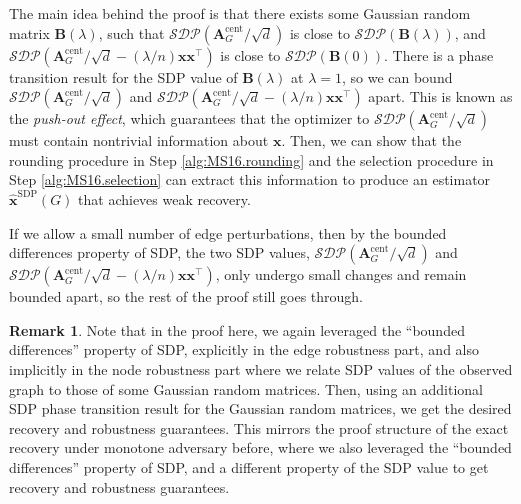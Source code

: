 \documentclass[11pt, titlepage]{article} %
\numberwithin{equation}{section}
\theoremstyle{definition}
\newtheorem{remark}{Remark}
\numberwithin{theorem}{section}
\numberwithin{lemma}{section}
\numberwithin{corollary}{section}
\numberwithin{proposition}{section}
\numberwithin{definition}{section}
\numberwithin{remark}{section}
\begin{document}
The main idea behind the proof is that there exists some Gaussian random matrix $\bm{B}(\lambda)$, 
such that $\mathcal{SDP}(\bm{A}_{G}^{\mathrm{cent}}/\sqrt{d})$ is close to 
$\mathcal{SDP}(\bm{B}(\lambda))$, and $\mathcal{SDP}(\bm{A}_{G}^{\mathrm{cent}}/\sqrt{d}
- (\lambda / n)\bm{x}\bm{x}^\top)$ is close to $\mathcal{SDP}(\bm{B}(0))$. There is a phase
transition result for the SDP value of $\bm{B}(\lambda)$ at $\lambda = 1$, so we can bound
$\mathcal{SDP}(\bm{A}_{G}^{\mathrm{cent}}/\sqrt{d})$ and $\mathcal{SDP}(\bm{A}_{G}^{\mathrm{cent}}/\sqrt{d}
- (\lambda / n)\bm{x}\bm{x}^\top)$ apart. This is known as the \emph{push-out effect},
which guarantees that the optimizer to $\mathcal{SDP}(\bm{A}_{G}^{\mathrm{cent}}/\sqrt{d})$ 
must contain nontrivial information about $\bm{x}$. Then, we can show that the rounding procedure in 
Step \ref{alg:MS16.rounding} and the selection procedure in Step \ref{alg:MS16.selection} can 
extract this information to produce an estimator $\hat{\bm{x}}^\mathrm{SDP}(G)$ that 
achieves weak recovery.

If we allow a small number of edge perturbations, then by the bounded differences property of SDP, 
the two SDP values, $\mathcal{SDP}(\bm{A}_{G}^{\mathrm{cent}}/\sqrt{d})$ and
$\mathcal{SDP}(\bm{A}_{G}^{\mathrm{cent}}/\sqrt{d} - (\lambda / n)\bm{x}\bm{x}^\top)$, only undergo
small changes and remain bounded apart, so the rest of the proof still goes through.

\begin{remark}
Note that in the proof here, we again leveraged the ``bounded differences'' property of SDP, explicitly
in the edge robustness part, and also implicitly in the node robustness part where we relate SDP 
values of the observed graph to those of some Gaussian random matrices. Then, using an additional SDP
phase transition result for the Gaussian random matrices, we get the desired recovery and robustness
guarantees. This mirrors the proof structure of the exact recovery under monotone adversary before,
where we also leveraged the ``bounded differences'' property of SDP, and a different property
of the SDP value to get recovery and robustness guarantees.
\end{remark}
\end{document}
